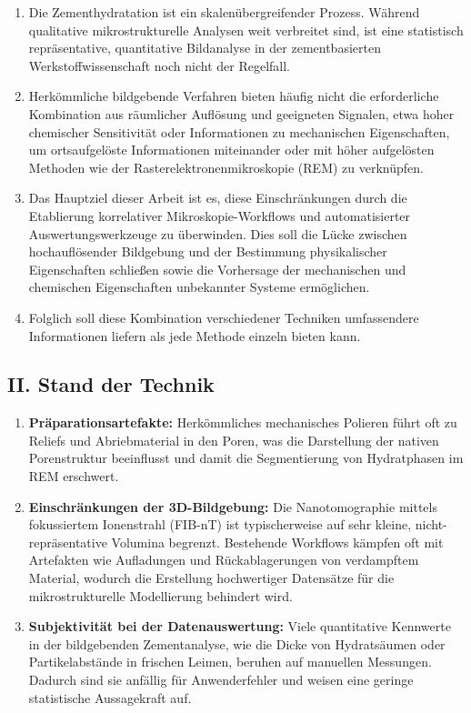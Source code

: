 \documentclass[11pt, a4paper]{article}
\begin{document}
\begin{enumerate}[label=\textbf{\arabic*.}, leftmargin=1.5cm, labelsep=0.5cm, itemsep=0.5em]
    \item Die Zementhydratation ist ein skalenübergreifender Prozess.
    Während qualitative mikrostrukturelle Analysen weit verbreitet sind, ist eine statistisch repräsentative, quantitative Bildanalyse in der zementbasierten Werkstoffwissenschaft noch nicht der Regelfall.
    \item Herkömmliche bildgebende Verfahren bieten häufig nicht die erforderliche Kombination aus räumlicher Auflösung und geeigneten Signalen, etwa hoher chemischer Sensitivität oder Informationen zu mechanischen Eigenschaften, um ortsaufgelöste Informationen miteinander oder mit höher aufgelösten Methoden wie der Rasterelektronenmikroskopie (REM) zu verknüpfen.
    \item Das Hauptziel dieser Arbeit ist es, diese Einschränkungen durch die Etablierung korrelativer Mikroskopie-Workflows und automatisierter Auswertungswerkzeuge zu überwinden.
    Dies soll die Lücke zwischen hochauflösender Bildgebung und der Bestimmung physikalischer Eigenschaften schließen sowie die Vorhersage der mechanischen und chemischen Eigenschaften unbekannter Systeme ermöglichen.
    \item Folglich soll diese Kombination verschiedener Techniken umfassendere Informationen liefern als jede Methode einzeln bieten kann.
\end{enumerate}

\subsection*{II. Stand der Technik}

\begin{enumerate}[label=\textbf{\arabic*.}, leftmargin=1.5cm, labelsep=0.5cm, itemsep=0.5em, resume]
    \item \textbf{Präparationsartefakte:} Herkömmliches mechanisches Polieren führt oft zu Reliefs und Abriebmaterial in den Poren, was die Darstellung der nativen Porenstruktur beeinflusst und damit die Segmentierung von Hydratphasen im REM erschwert.
    \item \textbf{Einschränkungen der 3D-Bildgebung:} Die Nano\-to\-mo\-gra\-phie mittels fokussiertem Ionenstrahl (FIB-nT) ist typischerweise auf sehr kleine, nicht-repräsentative Volumina begrenzt.
    Bestehende Workflows kämpfen oft mit Artefakten wie Aufladungen und Rückablagerungen von verdampftem Material, wodurch die Erstellung hochwertiger Datensätze für die mikrostrukturelle Modellierung behindert wird.
    \item \textbf{Subjektivität bei der Datenauswertung:} Viele quantitative Kennwerte in der bildgebenden Zementanalyse, wie die Dicke von Hydratsäumen oder Partikelabstände in frischen Leimen, beruhen auf manuellen Messungen. Dadurch sind sie anfällig für Anwenderfehler und weisen eine geringe statistische Aussagekraft auf.
\end{enumerate}
\end{document}

